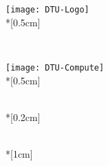 \begin{titlepage}
\begin{adjustwidth}{-0.5cm}{-0.5cm}
    \sffamily
    \begin{flushright}
        \texttt{[image: DTU-Logo]}\\*[0.5cm]
        \large
        \subjectid\\
        \subject\\
        \projectdate\\
    \end{flushright}
    \vspace*{\fill}
    \noindent
    \texttt{[image: DTU-Compute]}\\*[0.5cm]
        {\raggedright%
            \Huge 
            \projecttitle\\*[0.2cm]
        }
        \Large 
        \noindent\projectsubtitle\\*[1cm]
        \large
        \parbox[b]{0.75\textwidth}{%
        }
        
\end{adjustwidth}
\end{titlepage}